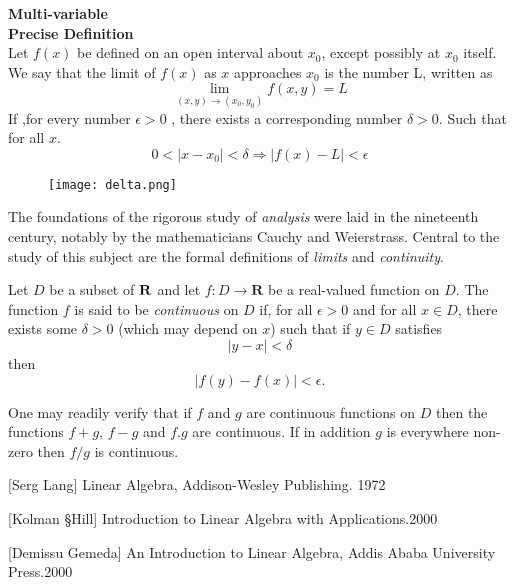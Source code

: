 \documentclass[12pt]{article}
\begin{document}
\newpage

\textcolor[rgb]{1.00,0.00,0.00}{\textbf{{\Large  Multi-variable}}}\\

    \textbf{\large Precise Definition}\\
Let $f(x)$ be defined on an open interval about $x_0$, except possibly at $x_0$ itself. We say that the limit of $f(x)$ as $x$ approaches $x_0$ is the number L, written as
$$
\lim_{(x,y)\rightarrow (x_0,y_0)} f(x,y)=L
$$
If ,for every number $\epsilon >0$ , there exists a corresponding number $\delta >0$. Such that for all $x$.
$$0<|x-x_0|<\delta\Rightarrow|f(x)-L|<\epsilon$$

\begin{wrapfigure}{l}{0.41\textwidth}
		\texttt{[image: delta.png]}
		\\	%
	\end{wrapfigure}

The foundations of the rigorous study of \emph{analysis}
were laid in the nineteenth century, notably by the
mathematicians Cauchy and Weierstrass. Central to the
study of this subject are the formal definitions of
\emph{limits} and \emph{continuity}.

Let $D$ be a subset of $\bf R$ and let
$f \colon D \to \mathbf{R}$ be a real-valued function on
$D$. The function $f$ is said to be \emph{continuous} on
$D$ if, for all $\epsilon > 0$ and for all $x \in D$,
there exists some $\delta > 0$ (which may depend on $x$)
such that if $y \in D$ satisfies
\[ |y - x| < \delta \]
then
\[ |f(y) - f(x)| < \epsilon. \]

One may readily verify that if $f$ and $g$ are continuous
functions on $D$ then the functions $f+g$, $f-g$ and
$f.g$ are continuous. If in addition $g$ is everywhere
non-zero then $f/g$ is continuous.
 \begin{thebibliography}{9}

[Serg Lang]
Linear Algebra,
Addison-Wesley Publishing. 1972

[Kolman \S  Hill]
Introduction to Linear Algebra with Applications.2000

[Demissu Gemeda]
An Introduction to Linear Algebra,
Addis Ababa University Press.2000

\end{thebibliography}
\end{document}
